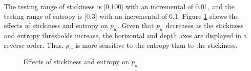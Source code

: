 \documentclass[review,3p,times,12pt,number]{elsarticle}
\begin{document}
The testing range of stickiness is [0,100] with an incremental of 0.01, and the testing range of entropy is [0,3] with an incremental of 0.1.
Figure \ref{weibo:fig:sepw} shows the effects of stickiness and entropy on $p_w$. Given that $p_w$ decreases as the stickiness and entropy thresholds increase, the horizontal and depth axes are displayed in a reverse order. Thus, $p_w$ is more sensitive to the entropy than to the stickiness.
\begin{figure}[htbp]
\centering
    \label{weibo:fig:sepw}
\caption{Effects of stickiness and entropy on $p_w$}
\end{figure}
\end{document}
